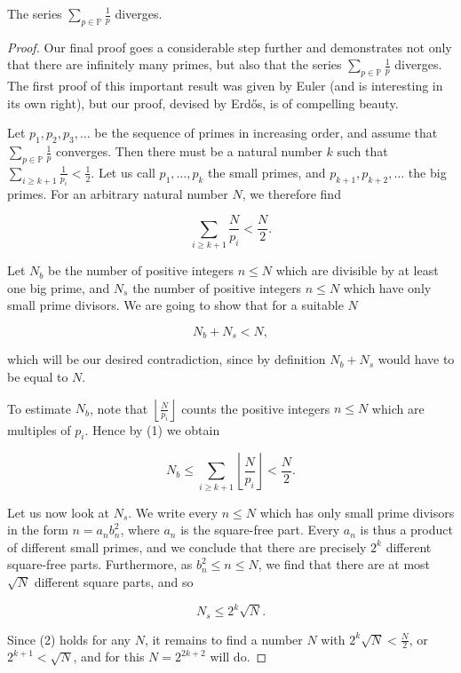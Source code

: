 \begin{theorem}
    \label{thm:sixth_proof}
    \leanok
    The series \(\sum_{p\in\mathbb{P}}\frac 1 p\) diverges.
\end{theorem}
\begin{proof}
    Our final proof goes a considerable step further and demonstrates not only that there are infinitely many primes,
    but also that the series \(\sum_{p \in \mathbb{P}} \frac{1}{p}\) diverges.
    The first proof of this important result was given by Euler (and is interesting in its own right), but our proof, devised by Erdős, is of compelling beauty.

    Let \(p_1, p_2, p_3, \dots\) be the sequence of primes in increasing order, and assume that \(\sum_{p \in \mathbb{P}} \frac{1}{p}\) converges.
    Then there must be a natural number \(k\) such that \(\sum_{i \geq k+1} \frac{1}{p_i} < \frac{1}{2}\).
    Let us call \(p_1, \dots, p_k\) the small primes, and \(p_{k+1}, p_{k+2}, \dots\) the big primes. For an arbitrary natural number \(N\), we therefore find

    \[
    \sum_{i \geq k+1} \frac{N}{p_i} < \frac{N}{2}. \tag{1}
    \]

    Let \(N_b\) be the number of positive integers \(n \leq N\) which are divisible by at least one big prime,
    and \(N_s\) the number of positive integers \(n \leq N\) which have only small prime divisors. We are going to show that for a suitable \(N\)

    \[
    N_b + N_s < N,
    \]

    which will be our desired contradiction, since by definition \(N_b + N_s\) would have to be equal to \(N\).

    To estimate \(N_b\), note that \(\left\lfloor \frac{N}{p_i} \right\rfloor\) counts the positive
    integers \(n \leq N\) which are multiples of \(p_i\). Hence by (1) we obtain

    \[
    N_b \leq \sum_{i \geq k+1} \left\lfloor \frac{N}{p_i} \right\rfloor < \frac{N}{2}. \tag{2}
    \]

    Let us now look at \(N_s\). We write every \(n \leq N\) which has only small prime
    divisors in the form \(n = a_n b_n^2\), where \(a_n\) is the square-free part. Every \(a_n\)
    is thus a product of different small primes, and we conclude that there are precisely \(2^k\)
    different square-free parts. Furthermore, as \(b_n^2 \leq n \leq N\), we find that there are at most \(\sqrt{N}\) different square parts, and so

    \[
    N_s \leq 2^k \sqrt{N}.
    \]

    Since (2) holds for any \(N\), it remains to find a number \(N\) with \(2^k \sqrt{N} < \frac{N}{2}\), or \(2^{k+1} < \sqrt{N}\), and for this \(N = 2^{2k+2}\) will do.
\end{proof}



